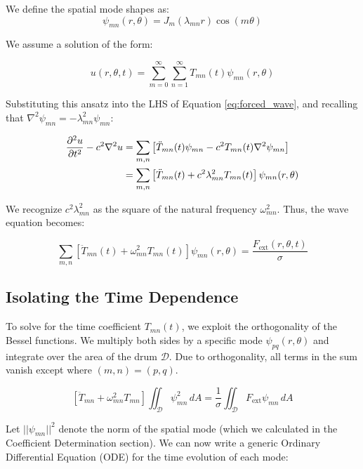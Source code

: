 \documentclass[11pt, letterpaper]{article}
\begin{document}
We define the spatial mode shapes as:
\begin{equation}
    \psi_{mn}(r, \theta) = J_m(\lambda_{mn} r) \cos(m\theta)
\end{equation}

We assume a solution of the form:

\begin{equation}
    u(r, \theta, t) = \sum_{m=0}^\infty \sum_{n=1}^\infty T_{mn}(t) \psi_{mn}(r, \theta)
\end{equation}

Substituting this ansatz into the LHS of Equation \ref{eq:forced_wave}, and recalling that $\nabla^2 \psi_{mn} = -\lambda_{mn}^2 \psi_{mn}$:

\begin{align}
    \pdv[2]{u}{t} - c^2 \nabla^2 u &= \sum_{m,n} \left[ \ddot{T}_{mn}(t) \psi_{mn} - c^2 T_{mn}(t) \nabla^2 \psi_{mn} \right] \\
    &= \sum_{m,n} \left[ \ddot{T}_{mn}(t) + c^2 \lambda_{mn}^2 T_{mn}(t) \right] \psi_{mn}(r, \theta)
\end{align}

We recognize $c^2 \lambda_{mn}^2$ as the square of the natural frequency $\omega_{mn}^2$. Thus, the wave equation becomes:

\begin{equation}
    \sum_{m,n} \left[ \ddot{T}_{mn}(t) + \omega_{mn}^2 T_{mn}(t) \right] \psi_{mn}(r, \theta) = \frac{F_{\text{ext}}(r, \theta, t)}{\sigma}
\end{equation}

\subsection{Isolating the Time Dependence}

To solve for the time coefficient $T_{mn}(t)$, we exploit the orthogonality of the Bessel functions. We multiply both sides by a specific mode $\psi_{pq}(r, \theta)$ and integrate over the area of the drum $\mathcal{D}$. Due to orthogonality, all terms in the sum vanish except where $(m,n) = (p,q)$.

\begin{equation}
    \left[ \ddot{T}_{mn} + \omega_{mn}^2 T_{mn} \right] \iint_{\mathcal{D}} \psi_{mn}^2 \, dA = \frac{1}{\sigma} \iint_{\mathcal{D}} F_{\text{ext}} \psi_{mn} \, dA
\end{equation}

Let $||\psi_{mn}||^2$ denote the norm of the spatial mode (which we calculated in the Coefficient Determination section). We can now write a generic Ordinary Differential Equation (ODE) for the time evolution of each mode:
\end{document}
